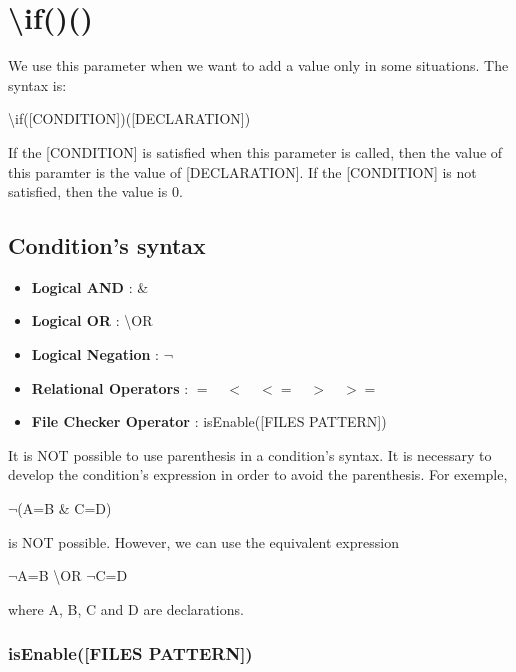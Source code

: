\documentclass[11pt,a4paper,openright,oneside]{book}
\begin{document}
\section{\textsf{\textbackslash if()()}}

We use this parameter when we want to add a value only in some situations. The syntax is:

\begin{center} \textsf{\textbackslash if(\textsc{\scriptsize[CONDITION]})(\textsc{\scriptsize[DECLARATION]})} \normalsize \end{center}

If the \textsc{\scriptsize[CONDITION]} is satisfied when this parameter is called, then the value of this paramter is the value of \textsc{\scriptsize[DECLARATION]}. If the \textsc{\scriptsize[CONDITION]} is not satisfied, then the value is \textsf{0}.

\subsection{Condition's syntax} \label{conditionSyntax}

\begin{itemize}
  \item \textbf{Logical AND} : \textsf{\scriptsize \&}
  \item \textbf{Logical OR} : \textbackslash \textsf{\scriptsize OR}
  \item \textbf{Logical Negation} : $\neg$
  \item \textbf{Relational Operators} : $= \quad < \quad <= \quad > \quad >=$ 
  \item \textbf{File Checker Operator} : \textsf{isEnable(\textsc{\scriptsize[FILES PATTERN]})} 
\end{itemize}

It is NOT possible to use parenthesis in a condition's syntax. It is necessary to develop the condition's expression in order to avoid the parenthesis. For exemple, 
\begin{center} \textsf{$\neg$(A=B \& C=D)} \end{center}
is NOT possible. However, we can use the equivalent expression 
\begin{center}\textsf{$\neg$A=B \textbackslash OR $\neg$C=D} \end{center}
where \textsf{A, B, C} and \textsf{D} are declarations.

\subsubsection{\textsf{isEnable(\textsc{\scriptsize[FILES PATTERN]})}}
\end{document}

